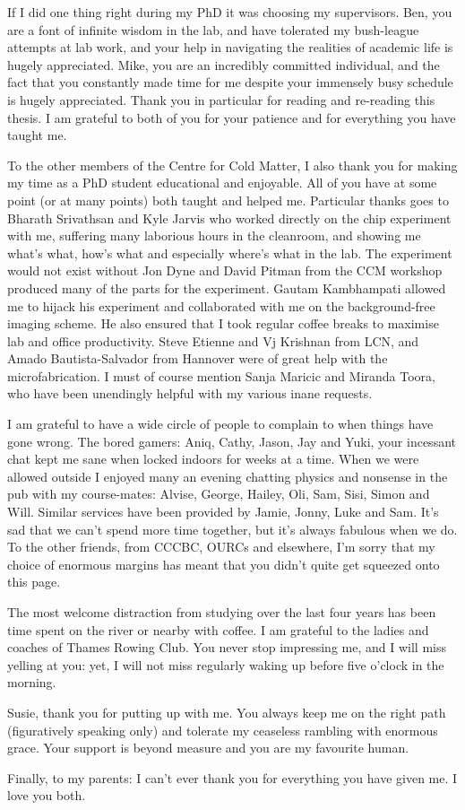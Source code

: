 \begin{singlespace}
If I did one thing right during my PhD it was choosing my supervisors. Ben, you
are a font of infinite wisdom in the lab, and have tolerated my bush-league
attempts at lab work, and your help in navigating the realities of academic
life is hugely appreciated. Mike, you are an incredibly committed individual,
and the fact that you constantly made time for me despite your immensely busy
schedule is hugely appreciated. Thank you in particular for reading and re-reading
this thesis.  I am grateful to both of you for your patience and for
everything you have taught me.

To the other members of the Centre for Cold Matter, I also thank you for making
my time as a PhD student educational and enjoyable. All of you have at some
point (or at many points) both taught and helped me.
%
Particular thanks goes to Bharath Srivathsan and Kyle Jarvis who worked
directly on the chip experiment with me, suffering many laborious hours in the
cleanroom, and showing me what's what, how's what and especially where's what
in the lab.
%
The experiment would not exist without Jon Dyne and David Pitman from the CCM
workshop produced many of the parts for the experiment.
%
Gautam Kambhampati allowed me to hijack his experiment and collaborated with me
on the background-free imaging scheme. He also ensured that I took
regular coffee breaks to maximise lab and office productivity.
%
Steve Etienne and Vj Krishnan from LCN, and Amado Bautista-Salvador from
Hannover were of great help with the microfabrication.
%
I must of course mention Sanja Maricic and Miranda Toora, who have been
unendingly helpful with my various inane requests.

I am grateful to have a wide circle of people to complain to when things have
gone wrong. The bored gamers: Aniq, Cathy, Jason, Jay and Yuki, your incessant
chat kept me sane when locked indoors for weeks at a time. When we were allowed
outside I enjoyed many an evening chatting physics and nonsense in the pub with
my course-mates: Alvise, George, Hailey, Oli, Sam, Sisi, Simon and Will. 
%
Similar services have been provided by Jamie, Jonny, Luke and Sam. It's sad
that we can't spend more time together, but it's always fabulous when we do. To
the other friends, from CCCBC, OURCs and elsewhere, I'm sorry that my choice of
enormous margins has meant that you didn't quite get squeezed onto this page.

The most welcome distraction from studying over the last four years has been
time spent on the river or nearby with coffee. I am grateful to the ladies and
coaches of Thames Rowing Club. You never stop impressing me, and I will miss
yelling at you: yet, I will not miss regularly waking up before five o'clock in the
morning.

Susie, thank you for putting up with me. You always keep me on the right path
(figuratively speaking only) and tolerate my ceaseless rambling with enormous
grace. Your support is beyond measure and you are my favourite human.

Finally, to my parents: I can't ever thank you for everything you have given
me. I love you both.

\end{singlespace}
